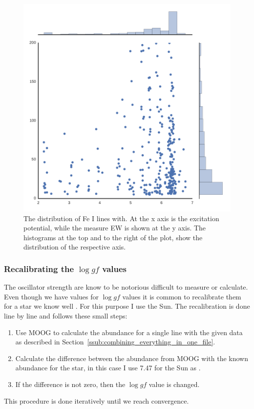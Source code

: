 \documentclass{aa}
\begin{document}
\begin{figure}[htpb]
    \centering
    \includegraphics[width=0.9\linewidth]{figures/EWvsEP_cut.pdf}
    \caption{The distribution of Fe I lines with. At the x axis is the
    excitation potential, while the measure EW is shown at the y axis.
    The histograms at the top and to the right of the plot, show the
    distribution of the respective axis.}
    \label{fig:Fe1_after_recal}
\end{figure}






\subsubsection{Recalibrating the $\log gf$ values}
\label{ssub:recalibrating_the_log_gf_values}
The oscillator strength are know to be notorious difficult to measure or
calculate. Even though we have values for $\log gf$ values it is common to
recalibrate them for a star we know well \citep{2012Onehag}. For this purpose I
use the Sun. The recalibration is done line by line and follows these small
steps:
\begin{enumerate}
    \item Use MOOG to calculate the abundance for a single line with the given
        data as described in
        Section~\ref{ssub:combining_everything_in_one_file}.
    \item Calculate the difference between the abundance from MOOG with the
        known abundance for the star, in this case I use 7.47 for the Sun as
        \citet{Gonzales2000}.
    \item If the difference is not zero, then the $\log gf$ value is changed.
\end{enumerate}
This procedure is done iteratively until we reach convergence.
\end{document}
